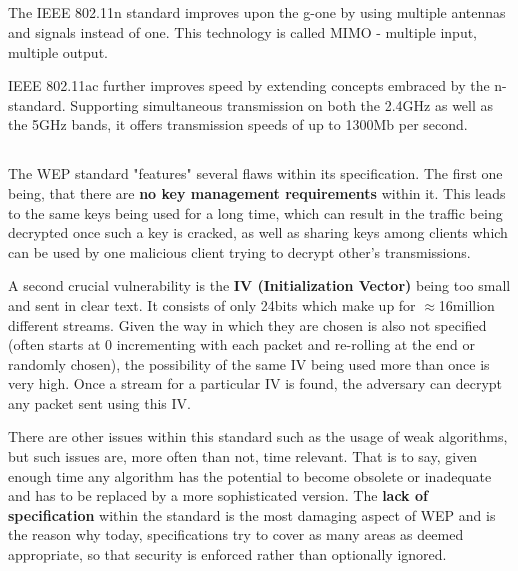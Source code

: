 \documentclass[12pt]{article}
\newcommand{\exercise}{\subsection{}\setcounter{subsubsection}{0}}
\begin{document}
\exercise
The IEEE 802.11n standard improves upon the g-one by using multiple antennas and signals instead of one. This technology is called MIMO - multiple input, multiple output.

IEEE 802.11ac further improves speed by extending concepts embraced by the n-standard. Supporting simultaneous transmission on both the 2.4GHz as well as the 5GHz bands, it offers transmission speeds of up to 1300Mb per second.

\exercise
The WEP standard "features" several flaws within its specification.
The first one being, that there are \textbf{no key management requirements} within it. This leads to the same keys being used for a long time, which can result in the traffic being decrypted once such a key is cracked, as well as sharing keys among clients which can be used by one malicious client trying to decrypt other's transmissions.

A second crucial vulnerability is the \textbf{IV (Initialization Vector)} being too small and sent in clear text. It consists of only 24bits which make up for $\approx$16million different streams. Given the way in which they are chosen is also not specified (often starts at 0 incrementing with each packet and re-rolling at the end or randomly chosen), the possibility of the same IV being used more than once is very high. Once a stream for a particular IV is found, the adversary can decrypt any packet sent using this IV.

There are other issues within this standard such as the usage of weak algorithms, but such issues are, more often than not, time relevant. That is to say, given enough time any algorithm has the potential to become obsolete or inadequate and has to be replaced by a more sophisticated version. The \textbf{lack of specification} within the standard is the most damaging aspect of WEP and is the reason why today, specifications try to cover as many areas as deemed appropriate, so that security is enforced rather than optionally ignored.
\end{document}
